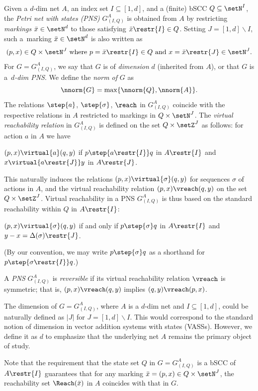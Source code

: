 \begin{defi}\label{def:PNS}
	Given a $d$-dim net $A$, an index set $I\subseteq [1,d]$, and a (finite) bSCC 
$Q\subseteq\setN^I$, 
the \emph{Petri net with states (PNS)} $G^A_{(I,Q)}$ 
	is obtained from  $A$ by restricting \emph{markings}
	$\bar{x}\in\setN^d$ 
	to those satisfying $\bar{x}\restr{I}\in Q$. 
Setting  $J=[1,d]\smallsetminus I$,
	such a~marking  $\bar{x}\in\setN^d$
	is also written as 
	\begin{equation*}
		\textnormal{$(p,x)\in
	Q\times \setN^J$ where 
		$p=\bar{x}\restr{I}\in Q$ and
		$x=\bar{x}\restr{J}\in\setN^J$.}
	\end{equation*}
For $G=G^A_{(I,Q)}$, we say that $G$ is of \emph{dimension} $d$
(inherited from $A$), or that $G$ is a~\emph{$d$-dim PNS}.
We define the \emph{norm of} $G$ as
	\[\nnorm{G}=\max\{\nnorm{Q},\nnorm{A}\}.\]
The relations $\step{a}$,
	$\step{\sigma}$, $\reach$ in $G^A_{(I,Q)}$  coincide with the respective
	relations in $A$ restricted to markings in $Q\times \setN^J$.
	The \emph{virtual reachability relation} in  $G^A_{(I,Q)}$ is defined 
on the set $Q\times \setZ^J$ as follows:
	for action $a$ in $A$ we have 
	\begin{center}
	$(p,x)\virtual{a}(q,y)$ if $p\step{a\restr{I}}q$ in
	$A\restr{I}$ and $x\virtual{a\restr{J}}y$ in $A\restr{J}$.
	\end{center}
	This naturally induces the
	relations $(p,x)\virtual{\sigma}(q,y)$ for sequences
	$\sigma$ of
	actions in $A$, and the virtual reachability relation
	$(p,x)\vreach(q,y)$ on the set $Q\times \setZ^J$. 
Virtual reachability in a PNS $G^A_{(I,Q)}$ is thus based on
the standard reachability within $Q$ in $A\restr{I}$:
	\begin{center}
	$(p,x)\virtual{\sigma}(q,y)$ if and only if $p\step{\sigma}q$ in
		$A\restr{I}$ and $y-x =\Delta(\sigma)\restr{J}$.
	\end{center}
(By our
	convention, we may write 
	 $p\step{\sigma}q$ as a shorthand for
	  $p\step{\sigma\restr{I}}q$.)



	A \emph{PNS} $G^A_{(I,Q)}$ is \emph{reversible} if its virtual
	reachability relation
	$\vreach$ is symmetric; that is, $(p,x)\vreach(q,y)$ implies 
	$(q,y)\vreach(p,x)$.
\end{defi}


\begin{rem}
The dimension of $G=G^A_{(I,Q)}$, where $A$ is a $d$-dim net and
	$I\subseteq [1,d]$,
	could be naturally defined as $|J|$ for $J=[1,d]\smallsetminus
	I$. This would correspond to
the standard notion 
	of dimension in vector addition systems with states (VASSs). 
However, we define it as $d$ to emphasize that the underlying net $A$
remains the primary object of study.  

Note that the requirement that the state set $Q$ in $G=G^A_{(I,Q)}$ is a bSCC of
	$A\restr{I}$ guarantees that for any marking
	$\bar{x}=(p,x)\in Q\times \setN^J$, the reachability set $\Reach(\bar{x})$ in $A$ coincides with that in $G$.
\end{rem}


